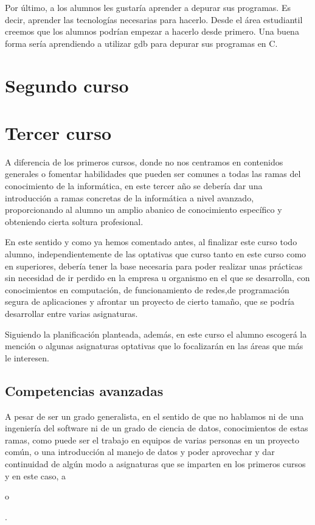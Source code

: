 Por último, a los alumnos les gustaría aprender a depurar sus programas.
Es decir, aprender las tecnologías necesarias para hacerlo.
Desde el área estudiantil creemos que los alumnos podrían empezar a
hacerlo desde primero.
Una buena forma sería
aprendiendo a utilizar gdb para depurar sus programas en C.

\section{Segundo curso}

\section{Tercer curso}
A diferencia de los primeros cursos, donde no nos centramos en contenidos generales o fomentar habilidades que pueden ser comunes a todas las ramas del conocimiento de la informática, en este tercer año se debería dar una introducción a ramas concretas de la informática a nivel avanzado, proporcionando al alumno un amplio abanico de conocimiento específico y obteniendo cierta soltura profesional.

En este sentido y como ya hemos comentado antes, al finalizar este curso todo alumno, independientemente de las optativas que curso tanto en este curso como en superiores, debería tener la base necesaria para poder realizar unas prácticas sin necesidad de ir perdido en la empresa u organismo en el que se desarrolla, con conocimientos en computación, de funcionamiento de redes,de programación segura de aplicaciones y afrontar un proyecto de cierto tamaño, que se podría desarrollar entre varias asignaturas.

Siguiendo la planificación planteada, además, en este curso el alumno escogerá la mención o algunas asignaturas optativas que lo focalizarán en las áreas que más le interesen.

\subsection{Competencias avanzadas}
A pesar de ser un grado generalista, en el sentido de que no hablamos ni de una ingeniería del software ni de un grado de ciencia de datos, conocimientos de estas ramas, como puede ser el trabajo en equipos de varias personas en un proyecto común, o una introducción al manejo de datos y poder aprovechar y dar continuidad de algún modo a asignaturas que se imparten en los primeros cursos y en este caso, a \subject{Estadística} o \subject{Bases de datos}.

